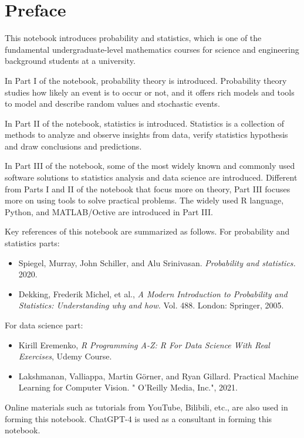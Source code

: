 \chapter*{Preface}

This notebook introduces probability and statistics, which is one of the fundamental undergraduate-level mathematics courses for science and engineering background students at a university.

In Part I of the notebook, probability theory is introduced. Probability theory studies how likely an event is to occur or not, and it offers rich models and tools to model and describe random values and stochastic events.

In Part II of the notebook, statistics is introduced. Statistics is a collection of methods to analyze and observe insights from data, verify statistics hypothesis and draw conclusions and predictions.

In Part III of the notebook, some of the most widely known and commonly used software solutions to statistics analysis and data science are introduced. Different from Parts I and II of the notebook that focus more on theory, Part III focuses more on using tools to solve practical problems. The widely used R language, Python, and MATLAB/Octive are introduced in Part III.

Key references of this notebook are summarized as follows. For probability and statistics parts:
\begin{itemize}
  \item Spiegel, Murray, John Schiller, and Alu Srinivasan. \textit{Probability and statistics.} 2020.
  \item Dekking, Frederik Michel, et al., \textit{A Modern Introduction to Probability and Statistics: Understanding why and how.} Vol. 488. London: Springer, 2005.
\end{itemize}
For data science part:
\begin{itemize}
  \item Kirill Eremenko, \textit{R Programming A-Z: R For Data Science With Real Exercises}, Udemy Course.
  \item Lakshmanan, Valliappa, Martin Görner, and Ryan Gillard. Practical Machine Learning for Computer Vision. " O'Reilly Media, Inc.", 2021.
\end{itemize} 

Online materials such as tutorials from YouTube, Bilibili, etc., are also used in forming this notebook. ChatGPT-4 is used as a consultant in forming this notebook.